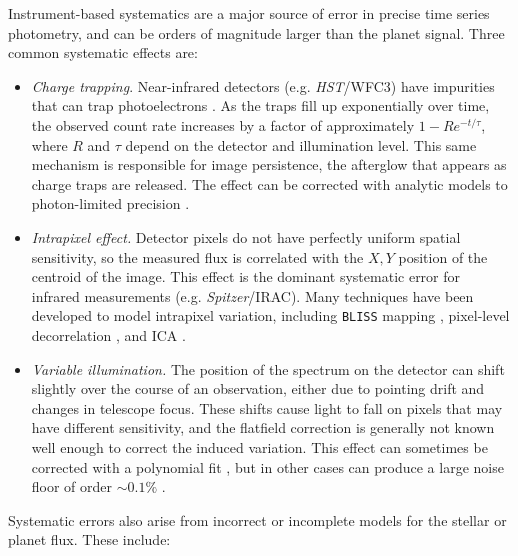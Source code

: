 \documentclass[graybox,natbib,nosecnum]{svmult}
\newcommand{\project}[1]{\textsl{#1}}
\newcommand{\HST}{\project{HST}}
\newcommand{\Spitzer}{\project{Spitzer}}
\begin{document}
Instrument-based systematics are a major source of error in precise time series photometry, and can be orders of magnitude larger than the planet signal. Three common systematic effects are: 

\begin{itemize}
\item{\emph{Charge trapping}. Near-infrared detectors (e.g. \HST/WFC3) have impurities that can trap photoelectrons \citep{smith08}. As the traps fill up exponentially over time, the observed count rate increases by a factor of approximately $1 - R e^{-t/\tau}$, where $R$ and $\tau$ depend on the detector and illumination level.  This same mechanism is responsible for image persistence, the afterglow that appears as charge traps are released. The effect can be corrected with analytic models to photon-limited precision \citep{deming13, line16}. 
}
\item{\emph{Intrapixel effect.} Detector pixels do not have perfectly uniform spatial sensitivity, so the measured flux is correlated with the $X, Y$ position of the centroid of the image. This effect is the dominant systematic error for infrared measurements (e.g. \Spitzer/IRAC). Many techniques have been developed to model intrapixel variation, including \texttt{BLISS} mapping \citep{stevenson12}, pixel-level decorrelation \citep{deming15}, and ICA \citep{morello15}.}
\item{\emph{Variable illumination.} The position of the spectrum on the detector can shift slightly over the course of an observation, either due to pointing drift and changes in telescope focus. These shifts cause light to fall on pixels that may have different sensitivity, and the flatfield correction is generally not known well enough to correct the induced variation. This effect can sometimes be corrected with a polynomial fit \citep[e.g. for HST/STIS observations;][]{sing11}, but in other cases can produce a large noise floor of order $\sim0.1\%$ \citep[as for the old HST instrument NICMOS][]{gibson11}.}
\end{itemize}

Systematic errors also arise from incorrect or incomplete models for the stellar or planet flux. These include: 
\end{document}
